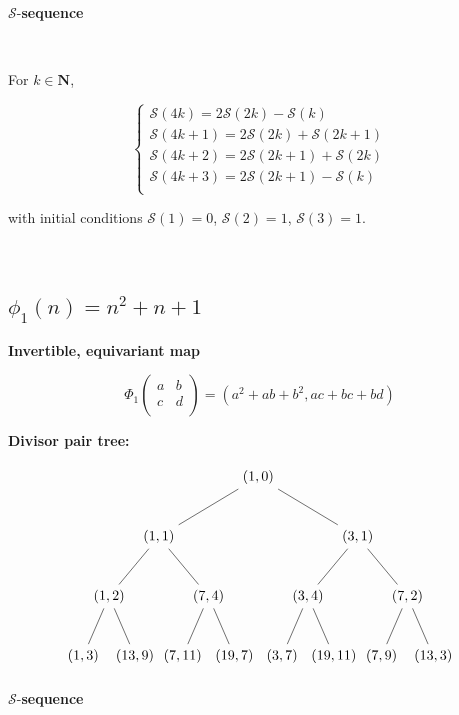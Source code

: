\documentclass{article}
\begin{document}
$\mathcal{S}$-\textbf{sequence}

\

For $k \in \mathbf{N}$,

$$
\begin{cases}
\mathcal{S}(4k) = 2\mathcal{S}(2k) - \mathcal{S}(k) \\
\mathcal{S}(4k+1) = 2\mathcal{S}(2k) + \mathcal{S}(2k+1) \\
\mathcal{S}(4k+2) =  2\mathcal{S}(2k+1) + \mathcal{S}(2k) \\
\mathcal{S}(4k+3) =  2\mathcal{S}(2k+1) - \mathcal{S}(k)  \\
\end{cases}
$$

with initial conditions $\mathcal{S}(1) = 0$, $\mathcal{S}(2) = 1$, $\mathcal{S}(3) = 1$.

\


\subsection{$\phi_1(n) = n^2 + n + 1$}

\textbf{Invertible, equivariant map}

$$\Phi_1 \begin{pmatrix}
    a & b \\
    c & d \\
\end{pmatrix} = (a^2 + ab + b^2, ac + bc + bd)$$

\textbf{Divisor pair tree:}

$$
\begin{tikzpicture}[level distance=15mm, 
                    level 1/.style={sibling distance=50mm},
                    level 2/.style={sibling distance=25mm},
                    level 3/.style={sibling distance=13mm}]
  \node {\((1, 0)\)}
    child {
      node {\((1, 1)\)} 
      child {
        node {\((1, 2)\)}
        child {node {\((1, 3)\)}}
        child {node {\((13, 9)\)}}
      }
      child {
        node {\((7, 4)\)}
        child {node {\((7, 11)\)}}
        child {node {\((19, 7)\)}}
      }
    }
    child {
      node {\((3, 1)\)}
      child {
        node {\((3, 4)\)}
        child {node {\((3, 7)\)}}
        child {node {\((19, 11)\)}}
      }
      child {
        node {\((7, 2)\)}
        child {node {\((7, 9)\)}}
        child {node {\((13, 3)\)}}
      } 
    };
\end{tikzpicture}
$$

$\mathcal{S}$-\textbf{sequence}
\end{document}
